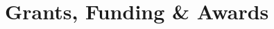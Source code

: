 \documentclass[11pt,letterpaper,sans]{moderncv}
\begin{document}
\vspace{-5mm}
\section{Grants, Funding \& Awards}
\end{document}
